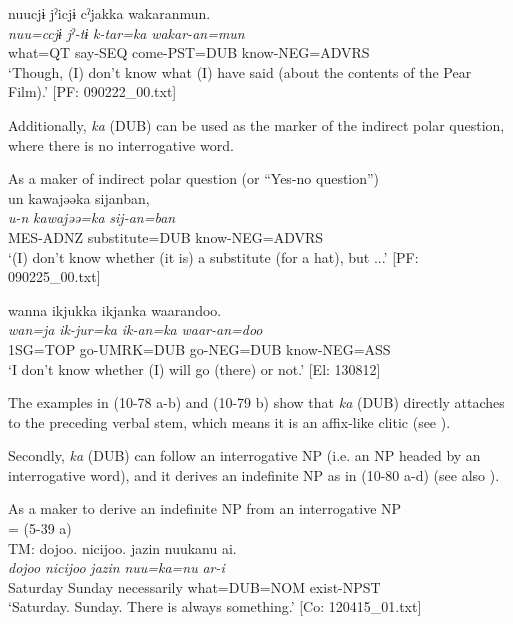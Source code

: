 \begin{xlist}
  \ex %
      \glll    nuucjɨ  jˀicjɨ  cˀjakka  wakaranmun.\\
      \textit{nuu=ccjɨ}  \textit{jˀ-tɨ}  \textit{k-tar=ka}  \textit{wakar-an=mun}\\
      what=QT  say-SEQ  come-PST=DUB  know-NEG=ADVRS\\
      \glt       ‘Though, (I) don’t know what (I) have said (about the contents of the Pear Film).’ [PF: 090222\_00.txt]
    \z
\z

Additionally, \textit{ka} (DUB) can be used as the marker of the indirect polar question, where there is no interrogative word.

\ea\label{ex:10.79}   As a maker of indirect polar question (or “Yes-no question”)\\
  \ea  %
      \glll    un  kawajəəka  sijanban,\\
      \textit{u-n}  \textit{kawajəə=ka}  \textit{sij-an=ban}\\
      MES-ADNZ  substitute=DUB  know-NEG=ADVRS\\
      \glt       ‘(I) don’t know whether (it is) a substitute (for a hat), but ...’ [PF: 090225\_00.txt]

  \ex  %
      \glll    wanna  ikjukka  ikjanka  waarandoo.\\
      \textit{wan=ja}  \textit{ik-jur=ka}  \textit{ik-an=ka}  \textit{waar-an=doo}\\
      1SG=TOP  go-UMRK=DUB  go-NEG=DUB  know-NEG=ASS\\
      \glt       ‘I don’t know whether (I) will go (there) or not.’ [El: 130812]
    \z
\z

The examples in (10-78 a-b) and (10-79 b) show that \textit{ka} (DUB) directly attaches to the preceding verbal stem, which means it is an affix-like clitic (see ).

  Secondly, \textit{ka} (DUB) can follow an interrogative NP (i.e. an NP headed by an interrogative word), and it derives an indefinite NP as in (10-80 a-d) (see also ).

\ea\label{ex:10.80}   As a maker to derive an indefinite NP from an interrogative NP\\
   \ea{} = (5-39 a)\\
    TM:
      \glll    {\textbar}dojoo{\textbar}.  {\textbar}nicijoo{\textbar}.  jazin  nuukanu  ai.\\
      \textit{dojoo}  \textit{nicijoo}  \textit{jazin}  \textit{nuu=ka=nu}  \textit{ar-i}\\
      Saturday  Sunday  necessarily  what=DUB=NOM  exist-NPST\\
      \glt       ‘Saturday. Sunday. There is always something.’ [Co: 120415\_01.txt]


\end{xlist}
